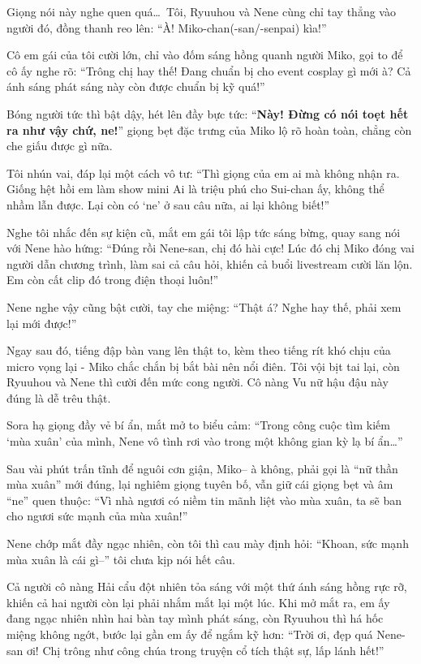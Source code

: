 \documentclass[../main.tex]{subfiles}
\begin{document}
Giọng nói này nghe quen quá\dots\ Tôi, Ryuuhou và Nene cùng chỉ tay thẳng vào người đó, đồng thanh reo lên: ``À! Miko-chan(-san/-senpai) kìa!''

Cô em gái của tôi cười lớn, chỉ vào đốm sáng hồng quanh người Miko, gọi to để cô ấy nghe rõ: ``Trông chị hay thế! Đang chuẩn bị cho event cosplay gì mới à? Cả ánh sáng phát sáng này còn được chuẩn bị kỹ quá!''

Bóng người tức thì bật dậy, hét lên đầy bực tức: ``\textbf{Này! Đừng có nói toẹt hết ra như vậy chứ, ne!}'' giọng bẹt đặc trưng của Miko lộ rõ hoàn toàn, chẳng còn che giấu được gì nữa.

Tôi nhún vai, đáp lại một cách vô tư: ``Thì giọng của em ai mà không nhận ra. Giống hệt hồi em làm show mini Ai là triệu phú cho Sui-chan ấy, không thể nhầm lẫn được. Lại còn có `ne' ở sau câu nữa, ai lại không biết!''

Nghe tôi nhắc đến sự kiện cũ, mắt em gái tôi lập tức sáng bừng, quay sang nói với Nene hào hứng: ``Đúng rồi Nene-san, chị đó hài cực! Lúc đó chị Miko đóng vai người dẫn chương trình, làm sai cả câu hỏi, khiến cả buổi livestream cười lăn lộn. Em còn cất clip đó trong điện thoại luôn!''

Nene nghe vậy cũng bật cười, tay che miệng: ``Thật á? Nghe hay thế, phải xem lại mới được!''

Ngay sau đó, tiếng đập bàn vang lên thật to, kèm theo tiếng rít khó chịu của micro vọng lại - Miko chắc chắn bị bắt bài nên nổi điên. Tôi vội bịt tai lại, còn Ryuuhou và Nene thì cười đến mức cong người. Cô nàng Vu nữ hậu đậu này đúng là dễ trêu thật.

Sora hạ giọng đầy vẻ bí ẩn, mắt mở to biểu cảm: ``Trong công cuộc tìm kiếm `mùa xuân' của mình, Nene vô tình rơi vào trong một không gian kỳ lạ bí ẩn\dots''

Sau vài phút trấn tĩnh để nguôi cơn giận, Miko-- à không, phải gọi là ``nữ thần mùa xuân'' mới đúng, lại nghiêm giọng tuyên bố, vẫn giữ cái giọng bẹt và âm ``ne'' quen thuộc: ``Vì nhà ngươi có niềm tin mãnh liệt vào mùa xuân, ta sẽ ban cho ngươi sức mạnh của mùa xuân!''

Nene chớp mắt đầy ngạc nhiên, còn tôi thì cau mày định hỏi: ``Khoan, sức mạnh mùa xuân là cái gì--'' tôi chưa kịp nói hết câu.

Cả người cô nàng Hải cẩu đột nhiên tỏa sáng với một thứ ánh sáng hồng rực rỡ, khiến cả hai người còn lại phải nhắm mắt lại một lúc. Khi mở mắt ra, em ấy đang ngạc nhiên nhìn hai bàn tay mình phát sáng, còn Ryuuhou thì há hốc miệng không ngớt, bước lại gần em ấy để ngắm kỹ hơn: ``Trời ơi, đẹp quá Nene-san ơi! Chị trông như công chúa trong truyện cổ tích thật sự, lấp lánh hết!''
\end{document}
